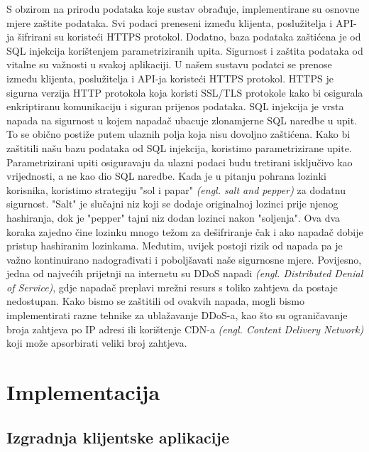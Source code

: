 \documentclass[times, utf8, zavrsni]{fer}
\begin{document}
S obzirom na prirodu podataka koje sustav obrađuje, implementirane su osnovne mjere zaštite podataka. Svi podaci preneseni između klijenta, poslužitelja i API-ja šifrirani su koristeći HTTPS protokol. Dodatno, baza podataka zaštićena je od SQL injekcija korištenjem parametriziranih upita. Sigurnost i zaštita podataka od vitalne su važnosti u svakoj aplikaciji. U našem sustavu podatci se prenose između klijenta, poslužitelja i API-ja koristeći HTTPS protokol. HTTPS je sigurna verzija HTTP protokola koja koristi SSL/TLS protokole kako bi osigurala enkriptiranu komunikaciju i siguran prijenos podataka. SQL injekcija je vrsta napada na sigurnost u kojem napadač ubacuje zlonamjerne SQL naredbe u upit. To se obično postiže putem ulaznih polja koja nisu dovoljno zaštićena. Kako bi zaštitili našu bazu podataka od SQL injekcija, koristimo parametrizirane upite. Parametrizirani upiti osiguravaju da ulazni podaci budu tretirani isključivo kao vrijednosti, a ne kao dio SQL naredbe. Kada je u pitanju pohrana lozinki korisnika, koristimo strategiju "sol i papar" \textit{(engl. salt and pepper)} za dodatnu sigurnost. "Salt" je slučajni niz koji se dodaje originalnoj lozinci prije njenog hashiranja, dok je "pepper" tajni niz dodan lozinci nakon "soljenja". Ova dva koraka zajedno čine lozinku mnogo težom za dešifriranje čak i ako napadač dobije pristup hashiranim lozinkama. Međutim, uvijek postoji rizik od napada pa je važno kontinuirano nadograđivati i poboljšavati naše sigurnosne mjere. Povijesno, jedna od najvećih prijetnji na internetu su DDoS napadi \textit{(engl. Distributed Denial of Service)}, gdje napadač preplavi mrežni resurs s toliko zahtjeva da postaje nedostupan. Kako bismo se zaštitili od ovakvih napada, mogli bismo implementirati razne tehnike za ublažavanje DDoS-a, kao što su ograničavanje broja zahtjeva po IP adresi ili korištenje CDN-a \textit{(engl. Content Delivery Network)} koji može apsorbirati veliki broj zahtjeva.

\chapter{Implementacija}
\section{Izgradnja klijentske aplikacije}
\end{document}
